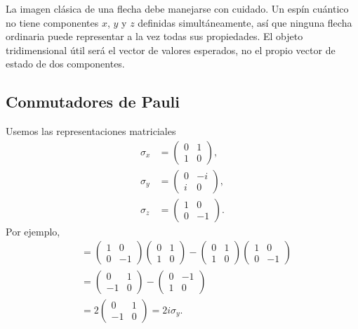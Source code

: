 La imagen clásica de una flecha debe manejarse con cuidado. Un espín cuántico no tiene componentes \(x\), \(y\) y \(z\) definidas simultáneamente, así que ninguna flecha ordinaria puede representar a la vez todas sus propiedades. El objeto tridimensional útil será el vector de valores esperados, no el propio vector de estado de dos componentes.

\subsection{Conmutadores de Pauli}

Usemos las representaciones matriciales
\begin{equation}
\begin{aligned}
\sigma_x&=
\begin{pmatrix}0&1\\1&0\end{pmatrix},\\[0.4em]
\sigma_y&=
\begin{pmatrix}0&-i\\i&0\end{pmatrix},\\[0.4em]
\sigma_z&=
\begin{pmatrix}1&0\\0&-1\end{pmatrix}.
\end{aligned}
\end{equation}
Por ejemplo,
\begin{align}
[\sigma_z,\sigma_x]
&=
\begin{pmatrix}1&0\\0&-1\end{pmatrix}
\begin{pmatrix}0&1\\1&0\end{pmatrix}
-
\begin{pmatrix}0&1\\1&0\end{pmatrix}
\begin{pmatrix}1&0\\0&-1\end{pmatrix}\\
&=
\begin{pmatrix}0&1\\-1&0\end{pmatrix}
-
\begin{pmatrix}0&-1\\1&0\end{pmatrix}\\
&=2
\begin{pmatrix}0&1\\-1&0\end{pmatrix}
=2i\sigma_y.
\end{align}
